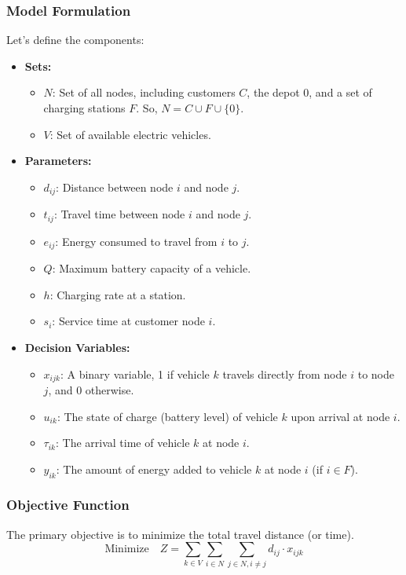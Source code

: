 \documentclass{article}
\begin{document}
\subsubsection{Model Formulation}
Let's define the components:
\begin{itemize}
    \item \textbf{Sets:}
    \begin{itemize}
        \item $N$: Set of all nodes, including customers $C$, the depot $0$, and a set of charging stations $F$. So, $N = C \cup F \cup \{0\}$.
        \item $V$: Set of available electric vehicles.
    \end{itemize}
    \item \textbf{Parameters:}
    \begin{itemize}
        \item $d_{ij}$: Distance between node $i$ and node $j$.
        \item $t_{ij}$: Travel time between node $i$ and node $j$.
        \item $e_{ij}$: Energy consumed to travel from $i$ to $j$.
        \item $Q$: Maximum battery capacity of a vehicle.
        \item $h$: Charging rate at a station.
        \item $s_i$: Service time at customer node $i$.
    \end{itemize}
    \item \textbf{Decision Variables:}
    \begin{itemize}
        \item $x_{ijk}$: A binary variable, 1 if vehicle $k$ travels directly from node $i$ to node $j$, and 0 otherwise.
        \item $u_{ik}$: The state of charge (battery level) of vehicle $k$ upon arrival at node $i$.
        \item $\tau_{ik}$: The arrival time of vehicle $k$ at node $i$.
        \item $y_{ik}$: The amount of energy added to vehicle $k$ at node $i$ (if $i \in F$).
    \end{itemize}
\end{itemize}

\subsubsection{Objective Function}
The primary objective is to minimize the total travel distance (or time).
\begin{equation}
\text{Minimize} \quad Z = \sum_{k \in V} \sum_{i \in N} \sum_{j \in N, i \neq j} d_{ij} \cdot x_{ijk}
\end{equation}
\end{document}
